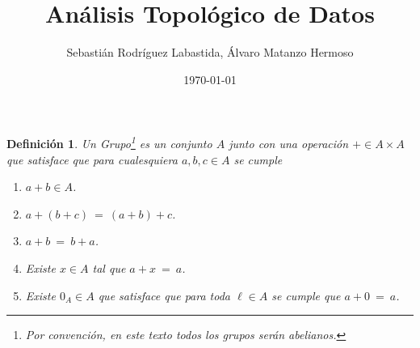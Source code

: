 \documentclass[12pt]{book}
\theoremstyle{plain}
\numberwithin{equation}{section} %
\newtheorem{definition}[thm]{Definición}
\begin{document}
\author{Sebastián Rodríguez Labastida, Álvaro Matanzo Hermoso}
\title{Análisis Topológico de Datos}
\date{\today}
\frontmatter
\maketitle

\begin{definition}
Un \textit{Grupo}\footnote{Por convención, en este texto todos los grupos serán abelianos.} es un conjunto $A$ junto con una operación $+ \in A \times A$ que satisface que para cualesquiera $a,b,c \in A$ se cumple
\begin{enumerate}
	\item $a+b\in A $.
	\item $a+(b+c) \ =\ (a+b) + c$.
	\item $a+b \ =\ b+a $.
	\item Existe $x\in A$ tal que $a+x \ =\ a$.
	\item Existe $0_A \in A$ que satisface que para toda $\ell \in A$ se cumple que $a+0 \ =\ a$.
\end{enumerate}
\end{definition}
\end{document}
